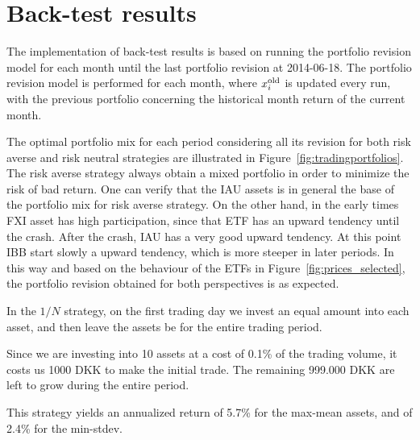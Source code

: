 \section{Back-test results}

The implementation of back-test results is based on running the portfolio revision model for each month until the last portfolio revision at 2014-06-18.
The portfolio revision model is performed for each month, where $x^{\textup{old}}_{i}$ is updated every run, with the previous portfolio concerning the historical month return of the current month.

The optimal portfolio mix for each period considering all its revision for both risk averse and risk neutral strategies are illustrated in Figure~\ref{fig:tradingportfolios}.
The risk averse strategy always obtain a mixed portfolio in order to minimize the risk of bad return.
One can verify that the IAU assets is in general the base of the portfolio mix for risk averse strategy. On the other hand, in the early times FXI asset has high participation, since that ETF has an upward tendency until the crash. After the crash, IAU has a very good upward tendency.
At this point IBB start slowly a upward tendency, which is more steeper in later periods.
In this way and based on the behaviour of the ETFs in Figure~\ref{fig:prices_selected}, the portfolio revision obtained for both perspectives is as expected.

In the $1/N$ strategy, on the first trading day we invest  an equal amount into each asset, and then leave the assets be for the entire trading period.

Since we are investing into 10 assets at a cost of 0.1\% of the trading volume, it costs us 1000 DKK to make the initial trade.
The remaining 999.000 DKK are left to grow during the entire period.

This strategy yields an annualized return of 5.7\% for the max-mean assets, and of 2.4\% for the min-stdev.

